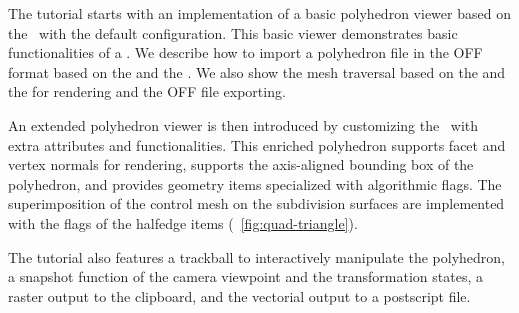 
The tutorial starts with an implementation of 
a basic polyhedron viewer based on the \cgalpoly\ with the 
default configuration.
This basic viewer demonstrates basic functionalities of a 
\cgalpoly . We describe how to import a polyhedron file in 
the OFF format based on the  and the 
. We also show the mesh traversal based on
the  and the  for rendering and 
the OFF file exporting. 

An extended polyhedron viewer is then introduced by customizing 
the \poly\ with extra attributes and functionalities. This 
enriched polyhedron supports facet and vertex normals for rendering, 
supports the axis-aligned bounding box of the polyhedron, and 
provides geometry items specialized with algorithmic flags. 
The superimposition of the control mesh on the subdivision surfaces
are implemented with the flags of the halfedge items 
(\figurename\ \ref{fig:quad-triangle}). 

The tutorial also features a trackball to interactively manipulate the
polyhedron, a snapshot function of the camera viewpoint and 
the transformation states, a raster output to the clipboard, and the
vectorial output to a postscript file.%

